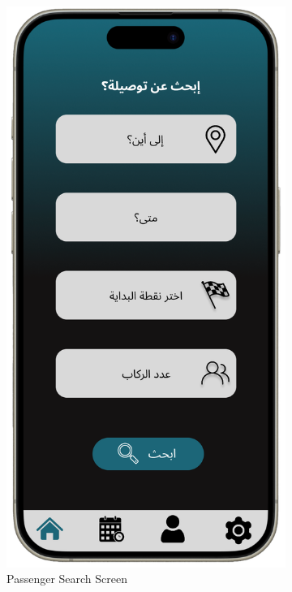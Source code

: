 \documentclass[a4paper, 12pt]{article} %
\begin{document}
\begin{figure}[h]
                \begin{subfigure}{0.3\textwidth}
                    \includegraphics[width=0.8\linewidth, height=0.9\textheight, keepaspectratio]{Images/App_Desgin_Home.png}
                    \caption{Passenger Search Screen}
                    \label{fig:our_passenger}
                \end{subfigure}
                \begin{subfigure}{0.3\textwidth}

\end{subfigure}
\end{figure}
\end{document}
